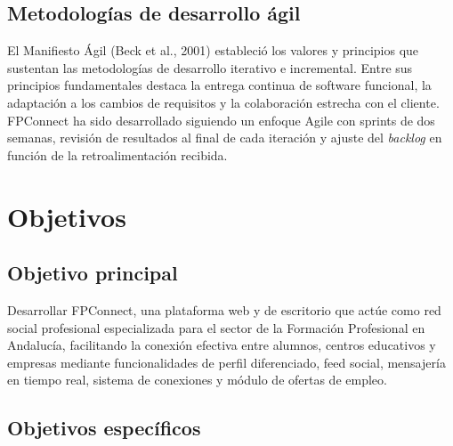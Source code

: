 \documentclass[a4paper]{report}
\begin{document}
\section{Metodologías de desarrollo ágil}

El Manifiesto Ágil (Beck et al., 2001) estableció los valores y principios que sustentan las metodologías de desarrollo iterativo e incremental. Entre sus principios fundamentales destaca la entrega continua de software funcional, la adaptación a los cambios de requisitos y la colaboración estrecha con el cliente. FPConnect ha sido desarrollado siguiendo un enfoque Agile con sprints de dos semanas, revisión de resultados al final de cada iteración y ajuste del \textit{backlog} en función de la retroalimentación recibida.

\newpage

\chapter{Objetivos}

\section{Objetivo principal}

Desarrollar FPConnect, una plataforma web y de escritorio que actúe como red social profesional especializada para el sector de la Formación Profesional en Andalucía, facilitando la conexión efectiva entre alumnos, centros educativos y empresas mediante funcionalidades de perfil diferenciado, feed social, mensajería en tiempo real, sistema de conexiones y módulo de ofertas de empleo.

\section{Objetivos específicos}
\end{document}

